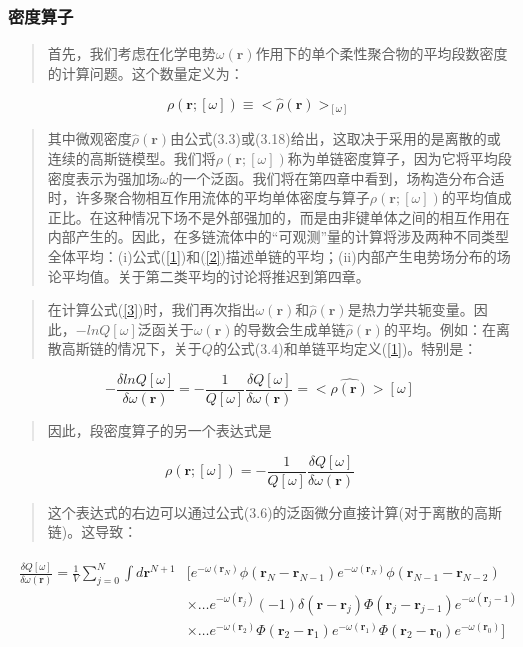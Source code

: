 \subsubsection{密度算子}
\begin{quotation}
	首先，我们考虑在化学电势$\omega(\mathbf{r})$作用下的单个柔性聚合物的平均段数密度的计算问题。这个数量定义为：
\end{quotation}
\begin{equation}\label{3}
\rho(\mathbf{r};[\omega])\equiv<\hat{\rho}(\mathbf{r})>_{[\omega]}
\end{equation}
\begin{quotation}
	其中微观密度$\hat{\rho}(\mathbf{r})$由公式(3.3)或(3.18)给出，这取决于采用的是离散的或连续的高斯链模型。我们将$\rho(\mathbf{r};[\omega])$称为单链密度算子，因为它将平均段密度表示为强加场$\omega$的一个泛函。我们将在第四章中看到，场构造分布合适时，许多聚合物相互作用流体的平均单体密度与算子$\rho(\mathbf{r};[\omega])$的平均值成正比。在这种情况下场不是外部强加的，而是由非键单体之间的相互作用在内部产生的。因此，在多链流体中的“可观测”量的计算将涉及两种不同类型全体平均：(i)公式(\ref{1})和(\ref{2})描述单链的平均；(ii)内部产生电势场分布的场论平均值。关于第二类平均的讨论将推迟到第四章。
\end{quotation}
\begin{quotation}
	在计算公式(\ref{3})时，我们再次指出$\omega(\mathbf{r})$和$\hat{\rho}(\mathbf{r})$是热力学共轭变量。因此，$-lnQ[\omega]$泛函关于$\omega(\mathbf{r})$的导数会生成单链$\hat{\rho}(\mathbf{r})$的平均。例如：在离散高斯链的情况下，关于$Q$的公式(3.4)和单链平均定义(\ref{1})。特别是：
\end{quotation}
\begin{equation}\label{4}
-\frac{\delta lnQ[\omega]}{\delta \omega(\mathbf{r})}=-\frac{1}{Q[\omega]}\frac{\delta Q[\omega]}{\delta \omega(\mathbf{r})}=<\hat{\rho(\mathbf{r})}>[\omega]
\end{equation}
\begin{quotation}
	因此，段密度算子的另一个表达式是
\end{quotation}
\begin{equation}\label{5}
\rho(\mathbf{r};[\omega])=-\frac{1}{Q[\omega]}\frac{\delta Q[\omega]}{\delta \omega(\mathbf{r})}
\end{equation}
\begin{quotation}
	这个表达式的右边可以通过公式(3.6)的泛函微分直接计算(对于离散的高斯链)。这导致：
\end{quotation}
\begin{align}\label{6}
\begin{split}
\frac{\delta Q[\omega]}{\delta \omega(\mathbf{r})}=\frac{1}{V}\sum_{j=0}^{N}\int d\mathbf{r}^{N+1}&[e^{-\omega(\mathbf{r}_{N})}\phi(\mathbf{r}_{N}-\mathbf{r}_{N-1})e^{-\omega(\mathbf{r}_{N})}\phi(\mathbf{r}_{N-1}-\mathbf{r}_{N-2}) \\ &\times \ldots e^{-\omega(\mathbf{r}_{j})}(-1)\delta(\mathbf{r}-\mathbf{r}_j)\Phi(\mathbf{r}_j-\mathbf{r}_{j-1})e^{-\omega(\mathbf{r}_j-1)}\\ & \times \ldots e^{-\omega(\mathbf{r}_{2})}\Phi(\mathbf{r}_{2}-\mathbf{r}_{1})e^{-\omega(\mathbf{r}_{1})}\Phi(\mathbf{r}_{2}-\mathbf{r}_{0})e^{-\omega(\mathbf{r}_{0})}]
\end{split}
\end{align}
